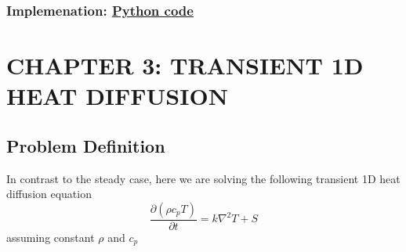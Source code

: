 \documentclass[14pt]{article}
\begin{document}
\subsubsection{Implemenation: \href{1D\_heat\_diffusion.py}{Python code}}
\label{sec:org1b699a4}
\clearpage
\section{CHAPTER 3: TRANSIENT 1D HEAT DIFFUSION}
\label{sec:orgca49ab7}
\subsection{Problem Definition}
\label{sec:org8374845}
In contrast to the steady case, here we are solving the following transient 1D heat diffusion equation
\begin{equation}
\frac{\partial (\rho c_p T)}{\partial t} = k \nabla^2 T + S
\end{equation}
assuming constant \(\rho\) and \(c_p\)
\end{document}
